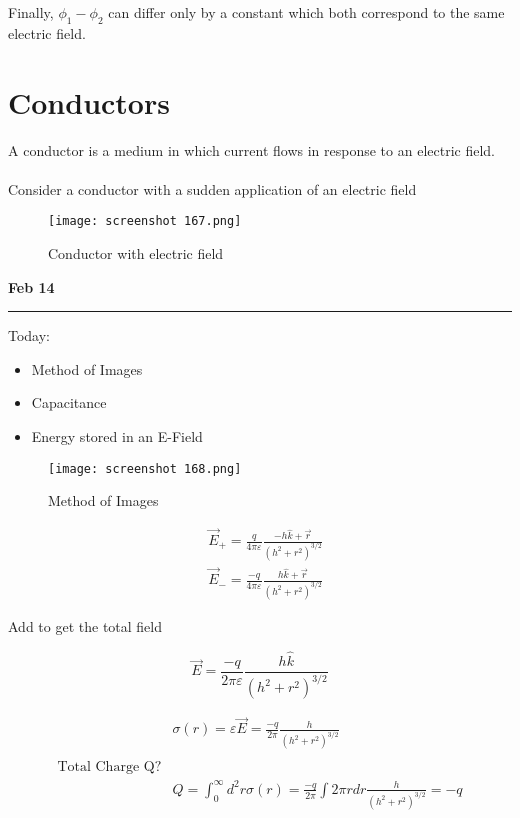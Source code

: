 \documentclass[svgnames]{article}   	%
\begin{document}
Finally, $\phi_1 - \phi_2$ can differ only by a constant which both correspond
to the same electric field. 


\section{Conductors}  

A conductor is a medium in which current flows in response to an electric
field. \mbox{}\\\\  

Consider a conductor with a sudden application of an electric field

\begin{figure}[H]
  \centering
    \texttt{[image: screenshot 167.png]}
    \caption{Conductor with electric field}
\end{figure}






\newpage
\noindent \textbf{Feb 14} \hrule
\vspace{10px}
Today:
\begin{itemize}
  \item Method of Images
  \item Capacitance 
  \item Energy stored in an E-Field
\end{itemize}

\begin{figure}[H]
  \centering
    \texttt{[image: screenshot 168.png]}
    \caption{Method of Images}
\end{figure}



\begin{align*}
  &\vec{E}_+ = \frac{q}{4\pi\varepsilon}\frac{-h \hat{k}+ \vec{r}}{(h^2
  + r^2)^{3/2}} \\
  &\vec{E}_- = \frac{-q}{4\pi\varepsilon} \frac{h \hat{k} + \vec{r}}{(h^2
  + r^2)^{3/2}}
\end{align*}

Add to get the total field 

\[
  \vec{E} = \frac{-q}{2\pi\varepsilon} \frac{h \hat{k}}{(h^2 + r^2)^{3/2}}
\]

\begin{align*}
  &\sigma(r) = \varepsilon \vec{E} = \frac{-q}{2\pi} \frac{h}{(h^2
  + r^2)^{3/2}}\\\\
  \text{Total Charge Q?} \\
  & Q = \int_0^\infty d^2r \sigma(r) = \frac{-q}{2\pi} \int 2\pi r dr
  \frac{h}{(h^2 + r^2)^{3/2}} = -q
\end{align*}
\end{document}
